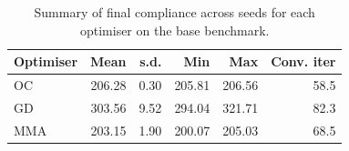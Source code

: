 \begin{table}[htbp]
\centering
\caption{Summary of final compliance across seeds for each optimiser on the base benchmark.}
\label{tab:summary}
\begin{tabular}{lrrrrr}
\toprule
Optimiser & Mean & s.d. & Min & Max & Conv. iter \\
\midrule
OC & 206.28 & 0.30 & 205.81 & 206.56 & 58.5 \\
GD & 303.56 & 9.52 & 294.04 & 321.71 & 82.3 \\
MMA & 203.15 & 1.90 & 200.07 & 205.03 & 68.5 \\
\bottomrule
\end{tabular}
\end{table}
